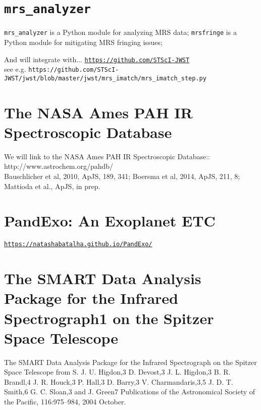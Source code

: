 
\section{{\tt mrs\_analyzer}} 
{\tt mrs\_analyzer} is  a Python module for analyzing MRS data; 
{\tt mrsfringe} is a Python module for mitigating MRS fringing issues; 

And will integrate with...
\href{https://github.com/STScI-JWST}{\tt https://github.com/STScI-JWST} \\
see e.g. 
{\tt https://github.com/STScI-JWST/jwst/blob/master/jwst/mrs\_imatch/mrs\_imatch\_step.py}

\section{The NASA Ames PAH IR Spectroscopic Database}
We will link to the NASA Ames PAH IR Spectroscopic Database:: \\
http://www.astrochem.org/pahdb/ \\
Bauschlicher et al, 2010, ApJS, 189, 341; Boersma et al, 2014, ApJS, 211, 8;  Mattioda et al., ApJS, in prep.\\


\section{PandExo: An Exoplanet ETC}
\href{https://natashabatalha.github.io/PandExo/}{\tt https://natashabatalha.github.io/PandExo/}


\section{The SMART Data Analysis Package for the Infrared Spectrograph1 on the Spitzer Space Telescope}
The SMART Data Analysis Package for the Infrared Spectrograph on the
Spitzer Space Telescope from S. J. U. Higdon,3 D. Devost,3
J. L. Higdon,3 B. R. Brandl,4 J. R. Houck,3 P. Hall,3 D. Barry,3
V. Charmandaris,3,5 J. D. T. Smith,6 G. C. Sloan,3 and J. Green7
Publications of the Astronomical Society of the Pacific, 116:975–984,
2004 October.
